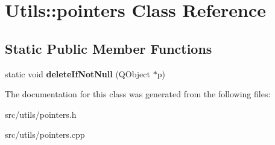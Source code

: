 \hypertarget{classUtils_1_1pointers}{}\section{Utils\+:\+:pointers Class Reference}
\label{classUtils_1_1pointers}
\subsection*{Static Public Member Functions}
\begin{DoxyCompactItemize}
\item 
\hypertarget{classUtils_1_1pointers_ad9a69267f8f8fff8a092fcee8a3d49ac}{}static void {\bfseries delete\+If\+Not\+Null} (Q\+Object $\ast$p)\label{classUtils_1_1pointers_ad9a69267f8f8fff8a092fcee8a3d49ac}

\end{DoxyCompactItemize}


The documentation for this class was generated from the following files\+:\begin{DoxyCompactItemize}
\item 
src/utils/pointers.\+h\item 
src/utils/pointers.\+cpp\end{DoxyCompactItemize}
